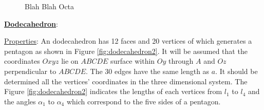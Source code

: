 \begin{center}
\begin{figure}[h]
\hfill
{}
\caption{Blah Blah Octa}
\label{fig:icosaPaths}
\end{figure}
\end{center}
%
\clearpage
\newpage
\noindent\uline{\textbf{Dodecahedron}}:


\noindent\uline{Properties}: 
An dodecahedron has 12 faces and 20 vertices of which generates a pentagon as shown in Figure \ref{fig:dodecahedron2}.
It will be assumed that the coordinates $Oxyz$ lie on $ABCDE$ surface within $Oy$ through $A$ and $Oz$ perpendicular to $ABCDE$.
The 30 edges have the same length as $a$. It should be determined all the vertices' coordinates in the three dimensional system.
The Figure \ref{fig:dodecahedron2} indicates the lengths of each vertices from $l_1$ to $l_4$ and the angles $\alpha_1$ to $\alpha_4$ which correspond to the five sides of a pentagon.

